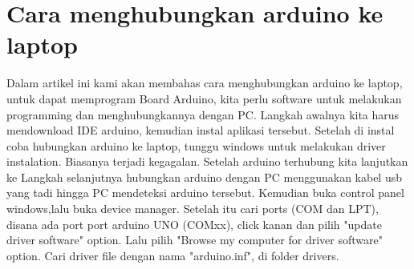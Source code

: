 \section{Cara menghubungkan arduino ke laptop}
Dalam artikel ini kami akan membahas cara menghubungkan arduino ke laptop, untuk dapat memprogram Board Arduino, kita perlu software untuk melakukan programming dan menghubungkannya dengan PC. Langkah awalnya kita harus mendownload IDE arduino, kemudian instal aplikasi tersebut. Setelah di instal coba hubungkan arduino ke laptop, tunggu windows untuk melakukan driver instalation. Biasanya terjadi kegagalan.
Setelah arduino terhubung kita lanjutkan ke Langkah selanjutnya hubungkan arduino dengan PC menggunakan kabel usb yang tadi hingga PC mendeteksi arduino tersebut. Kemudian buka control panel windows,lalu buka device manager. Setelah itu cari ports (COM dan LPT), disana ada port port arduino UNO (COMxx), click kanan dan pilih "update driver software" option.
Lalu pilih "Browse my computer for driver software" option. Cari driver file dengan nama "arduino.inf", di folder drivers.